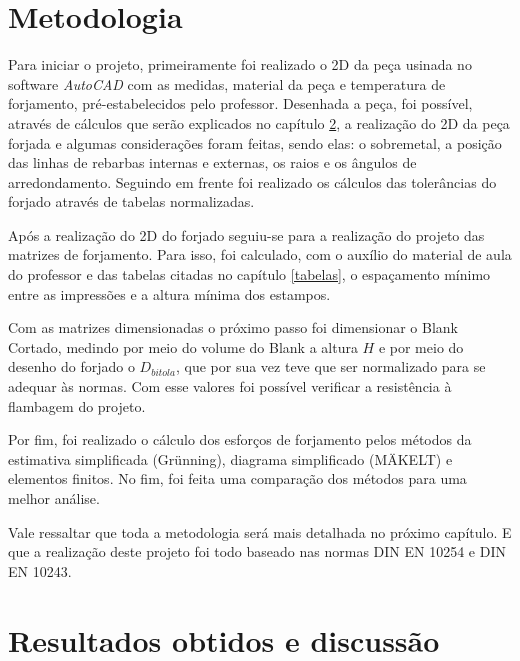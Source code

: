 \documentclass[deposito, acronym, symbols]{fei}
\begin{document}
\chapter{Metodologia}


Para iniciar o projeto, primeiramente foi realizado o 2D da peça usinada no software \textit{AutoCAD} com as medidas, material da peça e temperatura de forjamento, pré-estabelecidos pelo professor. Desenhada a peça, foi possível, através de cálculos que serão explicados no capítulo \ref{resultados}, a realização do 2D da peça forjada e algumas considerações foram feitas, sendo elas: o sobremetal, a posição das linhas de rebarbas internas e externas, os raios e os ângulos de arredondamento. Seguindo em frente foi realizado os cálculos das tolerâncias do forjado através de tabelas normalizadas.

Após a realização do 2D do forjado seguiu-se para a realização do projeto das matrizes de forjamento. Para isso, foi calculado, com o auxílio do material de aula do professor e das tabelas citadas no capítulo \ref{tabelas}, o espaçamento mínimo entre as impressões e a altura mínima dos estampos. 

Com as matrizes dimensionadas o próximo passo foi dimensionar o Blank Cortado, medindo por meio do volume do Blank a altura $H$ e por meio do desenho do forjado o $D_{bitola}$, que por sua vez teve que ser normalizado para se adequar às normas. Com esse valores foi possível verificar a resistência à flambagem do projeto. 

Por fim, foi realizado o cálculo dos esforços de forjamento pelos métodos da estimativa simplificada (Grünning), diagrama simplificado (MÄKELT) e elementos finitos. No fim, foi feita uma comparação dos métodos para uma melhor análise.

Vale ressaltar que toda a metodologia será mais detalhada no próximo capítulo. E que a realização deste projeto foi todo baseado nas normas DIN EN 10254 e DIN EN 10243. 


\chapter{Resultados obtidos e discussão} \label{resultados}



\end{document}

